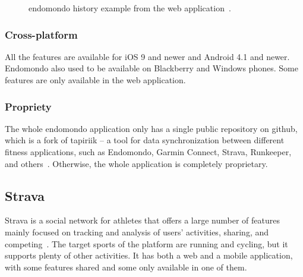 \begin{figure}[htb!]
    \centering
        \caption{endomondo history example from the web application~\cite{endomondo-history-img}.}
\end{figure}

\subsubsection*{Cross-platform}
All the features are available for iOS 9 and newer and Android 4.1 and newer.
Endomondo also used to be available on Blackberry and Windows phones.
Some features are only available in the web application.
\subsubsection*{Propriety}
The whole endomondo application only has a single public repository on github, which is a fork of tapiriik -- a tool for data synchronization between different fitness applications, such as Endomondo, Garmin Connect, Strava, Runkeeper, and others~\cite{endomondo-tapiriik}.
Otherwise, the whole application is completely proprietary.
\pagebreak
\pagebreak
\subsection{Strava}
Strava is a social network for athletes that offers a large number of features mainly focused on tracking and analysis of users' activities, sharing, and competing~\cite{strava}.
The target sports of the platform are running and cycling, but it supports plenty of other activities.
It has both a web and a mobile application, with some features shared and some only available in one of them.
